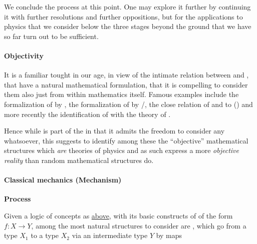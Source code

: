 \documentclass[12pt,titlepage]{article}
\theoremstyle{plain}
\theoremstyle{definition}
\theoremstyle{remark}
\begin{document}
We conclude the process at this point. One may explore it further by continuing it with further resolutions and further oppositions, but for the applications to physics that we consider below the three stages beyond the ground that we have so far turn out to be sufficient.

\hypertarget{objectivity}{}\paragraph*{{Objectivity}}\label{objectivity}

It is a familiar tought in our age, in view of the intimate relation between  and , that  have a natural mathematical formulation, that it is compelling to consider them also just from within mathematics itself. Famous examples include the formalization of  by , the formalization of  by /, the close relation of  and  to  () and more recently the identification of  with the theory of .

Hence while  is part of the  in that it admits the freedom to consider any  whatsoever, this suggests to identify among these the ``objective'' mathematical structures which \emph{are} theories of physics and as such express a more \emph{objective reality} than random mathematical structures do.

\hypertarget{classical_mechanics_mechanism}{}\paragraph*{{Classical mechanics (Mechanism)}}\label{classical_mechanics_mechanism}

\textbf{Process}

Given a logic of concepts as \hyperlink{ConceptFormalization}{above}, with its basic constructs of  of the form $f \colon X \to Y$, among the most natural structures to consider are , which go from a type $X_1$ to a type $X_2$ via an intermediate type $Y$ by maps
\end{document}

